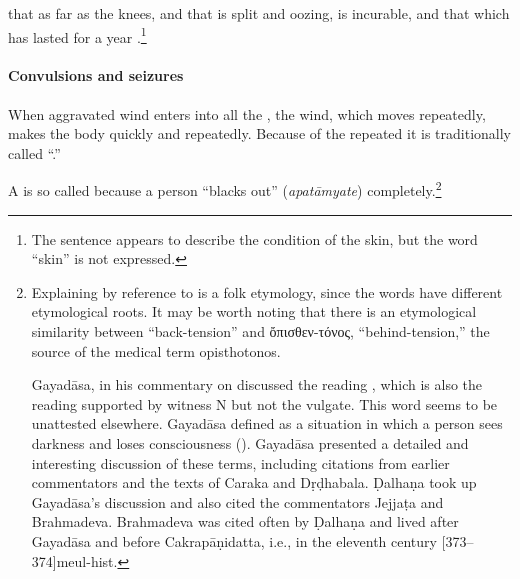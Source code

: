 \begin{translation}
\item[49ab, 50ab]

 that  as far as
the knees, and that is split and oozing, is incurable, and that which
has lasted for a year .\footnote{The
    sentence appears to describe the condition of the skin, but the word
    “skin” is not expressed.}
  
\paragraph{Convulsions and seizures}

\item[50cd--51]

When aggravated wind enters into all the , the
wind, which moves repeatedly, makes the body 
quickly and repeatedly. Because of the repeated
 it is traditionally called “.”


\item[52--56]

A  is so called because a person “blacks out”
(\emph{apatāmyate}) completely.\label{apatānaka}\footnote{\label{apatānaka-note}Explaining
     by reference to  is a folk etymology, since
    the words have different etymological roots.  It may be worth noting
    that there is an etymological similarity between   “back-tension” and \textgreek{ὄπισθεν-τόνος}, “behind-tension,” the source of the medical term opisthotonos. 
    
 Gayadāsa, in his commentary on  discussed the reading
, which is also the  reading supported by witness N but not
the vulgate.  This word seems to be unattested elsewhere.  Gayadāsa
defined  as a situation in which a person sees darkness and
loses consciousness (). Gayadāsa presented a
detailed and interesting discussion of these terms, including citations
from earlier commentators and the texts of Caraka and Dṛḍhabala. Ḍalhaṇa
took up Gayadāsa's discussion and also cited the commentators Jejjaṭa and
Brahmadeva. Brahmadeva was cited often by Ḍalhaṇa and lived after Gayadāsa
and before Cakrapāṇidatta, i.e., in the eleventh century
[373--374]{meul-hist}.\label{Brahmadeva}}


\end{translation}
